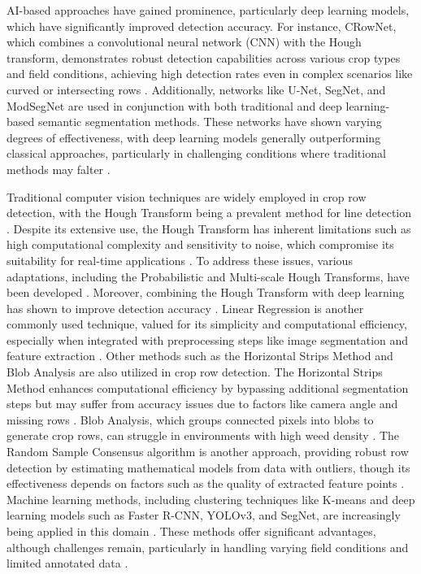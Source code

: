 \documentclass[conference]{IEEEtran}
\begin{document}
AI-based approaches have gained prominence, particularly deep learning models, which have significantly improved detection accuracy. For instance, CRowNet, which combines a convolutional neural network (CNN) with the Hough transform, demonstrates robust detection capabilities across various crop types and field conditions, achieving high detection rates even in complex scenarios like curved or intersecting rows \cite{b8,b14}. Additionally, networks like U-Net, SegNet, and ModSegNet are used in conjunction with both traditional and deep learning-based semantic segmentation methods. These networks have shown varying degrees of effectiveness, with deep learning models generally outperforming classical approaches, particularly in challenging conditions where traditional methods may falter \cite{b5,b13}.

Traditional computer vision techniques are widely employed in crop row detection, with the Hough Transform being a prevalent method for line detection \cite{b2,b15}. Despite its extensive use, the Hough Transform has inherent limitations such as high computational complexity and sensitivity to noise, which compromise its suitability for real-time applications \cite{b2}. To address these issues, various adaptations, including the Probabilistic and Multi-scale Hough Transforms, have been developed \cite{b2}. Moreover, combining the Hough Transform with deep learning has shown to improve detection accuracy \cite{b8}. Linear Regression is another commonly used technique, valued for its simplicity and computational efficiency, especially when integrated with preprocessing steps like image segmentation and feature extraction \cite{b2,b3}. Other methods such as the Horizontal Strips Method and Blob Analysis are also utilized in crop row detection. The Horizontal Strips Method enhances computational efficiency by bypassing additional segmentation steps but may suffer from accuracy issues due to factors like camera angle and missing rows \cite{b2}. Blob Analysis, which groups connected pixels into blobs to generate crop rows, can struggle in environments with high weed density \cite{b2}. The Random Sample Consensus algorithm is another approach, providing robust row detection by estimating mathematical models from data with outliers, though its effectiveness depends on factors such as the quality of extracted feature points \cite{b2}. Machine learning methods, including clustering techniques like K-means and deep learning models such as Faster R-CNN, YOLOv3, and SegNet, are increasingly being applied in this domain \cite{b2,b5}. These methods offer significant advantages, although challenges remain, particularly in handling varying field conditions and limited annotated data \cite{b2,b5}.
\end{document}

